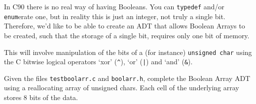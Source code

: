 
In C90 there is no real way of having Booleans.
You can \verb^typedef^ and/or \verb^enum^erate one, but in reality this is
just an integer, not truly a single bit.
Therefore, we'd like to be able to create an ADT that allows Boolean Arrays
to be created, such that the storage of a single bit, requires only one bit of memory.

\noindent
This will involve manipulation of the bits of a (for instance) \verb^unsigned char^
using the C bitwise logical operators `xor' (\verb#^#), `or' (\verb^|^) and `and' (\verb^&^).

\begin{exercise}
Given the files \verb^testboolarr.c^ and \verb^boolarr.h^, complete the Boolean Array ADT using
a reallocating array of unsigned chars. Each cell of the underlying array stores $8$ bits
of the data. 
\end{exercise}
